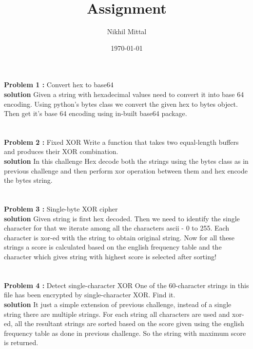 \documentclass[12pt]{assignment}
\title{Assignment}
\author{Nikhil Mittal}
\date{\today}
\begin{document}
    \maketitle
    
    \textbf{Problem 1 :}
    Convert hex to base64\\
    
    \textbf{solution}
    Given a string with hexadecimal values need to convert it into base 64 encoding. 
    Using python's bytes class we convert the given hex to bytes object. Then get it's base 64 encoding using in-built base64 package.\\\\
    
	\\

	\textbf{Problem 2 :}
    Fixed XOR
    Write a function that takes two equal-length buffers and produces their XOR combination.\\
    
    \textbf{solution}
    In this challenge Hex decode both the strings using the bytes class as in previous challenge and then perform xor operation between them and hex encode the bytes string.\\\\
    

    \\

    \textbf{Problem 3 :}
    Single-byte XOR cipher\\
    
    
    \textbf{solution}
    Given string is first hex decoded. Then we need to identify the single character for that we iterate among all the characters ascii - 0 to 255. Each character is xor-ed with the string to obtain original string. Now for all these strings a score is calculated based on the english frequency table and the character which gives string with highest score is selected after sorting! \\\\
    

    \\

    \textbf{Problem 4 :}
    Detect single-character XOR
One of the 60-character strings in this file has been encrypted by single-character XOR. Find it.\\
    
    
    \textbf{solution}
    It just a simple extension of previous challenge, instead of a single string there are multiple strings. For each string all characters are used and xor-ed, all the resultant strings are sorted based on the score given using the english frequency table as done in previous challenge. So the string with maximum score is returned.\\\\
    
\end{document}
